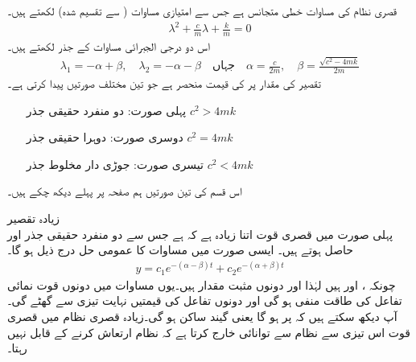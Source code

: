 قصری نظام کی مساوات خطی متجانس ہے جس سے  امتیازی مساوات ( سے تقسیم شدہ) لکھتے ہیں۔
\begin{align*}
\lambda^2+\frac{c}{m}\lambda+\frac{k}{m}=0
\end{align*}
اس دو درجی الجبرائی مساوات کے جذر لکھتے ہیں۔
\begin{align}\label{مساوات_سادہ_دو_درجی_تقصیری_مستقل}
\lambda_1=-\alpha+\beta, \quad \lambda_2=-\alpha-\beta \quad \text{جہاں} \quad \alpha=\frac{c}{2m}, \quad \beta=\frac{\sqrt{c^2-4mk}}{2m}
\end{align}
تقصیر کی مقدار پر  کی قیمت منحصر ہے جو تین مختلف صورتیں پیدا کرتی ہے۔
 \begin{itemize}
\item[پہلی صورت:]
  دو منفرد حقیقی جذر \quad $c^2>4mk$
\item[دوسری صورت:]
  دوہرا حقیقی جذر \quad $c^2=4mk$
\item[تیسری صورت:]
  جوڑی دار مخلوط جذر \quad $c^2<4mk$ 
\end{itemize}
اس قسم کی تین صورتیں ہم  صفحہ  پر پہلے دیکھ چکے ہیں۔

\quad زیادہ تقصیر\\
پہلی صورت میں قصری قوت اتنا زیادہ ہے کہ  ہے جس سے دو منفرد حقیقی جذر  اور  حاصل ہوتے ہیں۔ ایسی صورت میں مساوات  کا عمومی حل درج ذیل ہو گا۔
\begin{align}\label{مساوات_سادہ_دو_درجی_قصری_زیادہ_حل_الف}
y=c_1 e^{-(\alpha-\beta)t}+c_2e^{-(\alpha+\beta)t}
\end{align}
چونکہ ،  اور  ہیں لہٰذا  اور  دونوں مثبت مقدار ہیں۔یوں  مساوات  میں دونوں قوت نمائی تفاعل کی طاقت منفی ہو گی اور دونوں تفاعل کی قیمتیں نہایت تیزی سے گھٹے گی۔آپ دیکھ سکتے ہیں کہ  پر  ہو گا یعنی گیند ساکن ہو گی۔زیادہ قصری نظام میں قصری قوت اس تیزی سے نظام سے توانائی خارج کرتا ہے کہ نظام ارتعاش کرنے کے قابل نہیں رہتا۔

